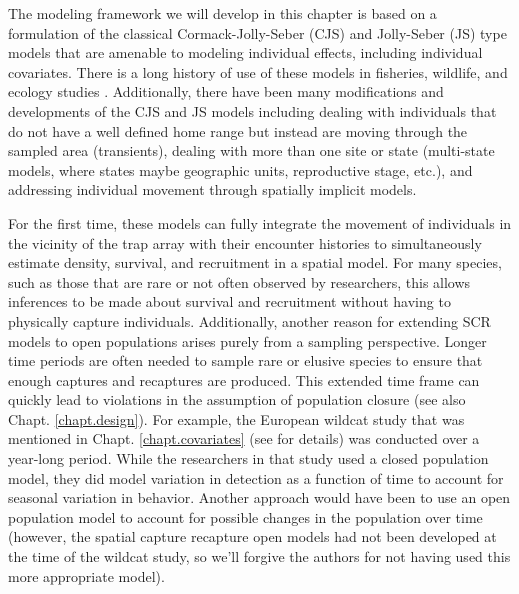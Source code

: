 The modeling framework we will develop in this chapter is based on a
formulation of the classical Cormack-Jolly-Seber (CJS) and Jolly-Seber
(JS) type models \citep{cormack:1964, jolly:1965, seber:1965} that are
amenable to modeling individual effects, including individual
covariates.  There is a long history of use of these models in
fisheries, wildlife, and ecology studies \citep{pollock_etal:1990,
  lebreton_etal:1992, pradel:1996, williams_etal:2002,
  schwarz_arnason:2005, gimenez:2007}.  Additionally, there have been
many modifications and developments of the CJS and JS models including
dealing with individuals that do not
have a well defined home range but
instead are moving through the sampled area (transients), dealing with
more than one site or state (multi-state models, where states maybe
geographic units, reproductive stage, etc.), and addressing individual
movement through spatially implicit models.

 
For the first time, these models can fully
integrate the movement of individuals in the vicinity of the
trap array
with their encounter histories to simultaneously estimate density,
survival, and recruitment in a spatial model.
For many species, such
as those that are rare or not often observed by researchers, this allows
inferences to be made about survival and recruitment without having
to physically capture individuals.
Additionally, another reason for
extending SCR models to open populations arises purely from a
sampling perspective.  Longer time periods are often needed to sample
rare or elusive species to ensure that enough captures and recaptures
are produced.  This extended time frame can quickly lead to violations
in the assumption of population closure (see also Chapt. \ref{chapt.design}).  For example, the European
wildcat study that was mentioned in Chapt. \ref{chapt.covariates} (see
\citet{kery_etal:2011} for details) was
conducted over a year-long period.  While the researchers in that
study used a closed population model, they did model variation in detection
as a function of time to account for seasonal variation in behavior. 
 Another approach would have been to use an
open population model to account for possible changes in the population over time
(however, the spatial capture recapture open models had
not been developed at the time of the wildcat study, so we'll forgive
the authors for not having used this more appropriate model).

